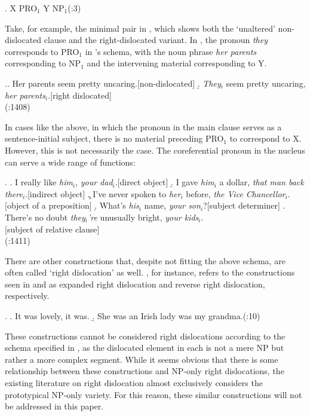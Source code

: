 \documentclass[titlepage,12pt]{article}
\begin{document}
\ex. X PRO$_1$ Y NP$_1$\hfill (\citealt{grosz_centering_1998}:3)

Take, for example, the minimal pair in \Next, which shows both the `unaltered' non-dislocated clause and the right-dislocated variant. In \Next[b], the pronoun \textit{they} corresponds to PRO$_1$ in \citeauthor{grosz_centering_1998}'s schema, with the noun phrase \textit{her parents} corresponding to NP$_1$ and the intervening material corresponding to Y. 

\ex.\a. Her parents seem pretty uncaring.\hfill [non-dislocated]
\b. \emph{They$_i$} seem pretty uncaring, \emph{her parents$_i$}.\hfill [right dislocated]\\\phantom{x}\hfill (\citealt{huddleston_cambridge_2002}:1408)

In cases like the above, in which the pronoun in the main clause serves as a sentence-initial subject, there is no material preceding PRO$_1$ to correspond to X. However, this is not necessarily the case. The coreferential pronoun in the nucleus can serve a wide range of functions:

\ex. \a. I really like \emph{him$_i$}, \emph{your dad$_i$}.\hfill [direct object]
\b. I gave \emph{him$_i$} a dollar, \emph{that man back there$_i$}.\hfill [indirect object]
\c. I've never spoken to \emph{her$_i$} before, \emph{the Vice Chancellor$_i$}.\hfill [object of a preposition]
\d. What's \emph{his$_i$} name, \emph{your son$_i$}?\hfill [subject determiner]
\e. There's no doubt \emph{they$_i$'re} unusually bright, \emph{your kids$_i$}.\\\phantom{x}\hfill [subject of relative clause]\\\phantom{x}\hfill (\citealt{huddleston_cambridge_2002}:1411)

\par
There are other constructions that, despite not fitting the above schema, are often called `right dislocation' as well. \citet{durham_right_2011}, for instance, refers to the constructions seen in \Next[a] and \Next[b] as expanded right dislocation and reverse right dislocation, respectively.

\ex. \a. It was lovely, it was.
\b. She was an Irish lady was my grandma.\hfill (\citealt{durham_right_2011}:10)

These constructions cannot be considered right dislocations according to the schema specified in \citealt{grosz_centering_1998}, as the dislocated element in each is not a mere NP but rather a more complex segment. While it seems obvious that there is some relationship between these constructions and NP-only right dislocations, the existing literature on right dislocation almost exclusively considers the prototypical NP-only variety. For this reason, these similar constructions will not be addressed in this paper.
\end{document}
